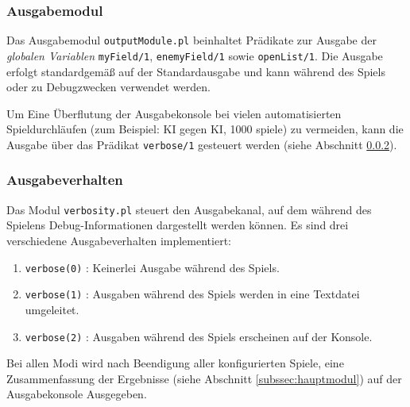 \subsubsection{Ausgabemodul}
		Das Ausgabemodul \texttt{outputModule.pl} beinhaltet Prädikate zur Ausgabe der \textit{globalen Variablen} \texttt{myField/1},
		\texttt{enemyField/1} sowie \texttt{openList/1}. Die Ausgabe erfolgt standardgemäß auf der Standardausgabe und kann während des Spiels oder zu
		Debugzwecken verwendet werden.

		Um Eine Überflutung der Ausgabekonsole bei vielen automatisierten Spieldurchläufen (zum Beispiel: KI gegen KI, 1000 spiele) zu vermeiden, kann 
		die Ausgabe über das Prädikat \texttt{verbose/1} gesteuert werden (siehe Abschnitt \ref{ssub:ausgabeverhalten}).
\subsubsection{Ausgabeverhalten} %
\label{ssub:ausgabeverhalten}
		Das Modul \texttt{verbosity.pl} steuert den Ausgabekanal, auf dem während des Spielens Debug-Informationen dargestellt werden können. 
		Es sind drei verschiedene Ausgabeverhalten implementiert:
			\begin{enumerate}
				\item \texttt{verbose(0)} : Keinerlei Ausgabe während des Spiels.
				\item \texttt{verbose(1)} : Ausgaben während des Spiels werden in eine Textdatei umgeleitet.
				\item \texttt{verbose(2)} : Ausgaben während des Spiels erscheinen auf der Konsole.
			\end{enumerate}
			Bei allen Modi wird nach Beendigung aller konfigurierten Spiele, eine Zusammenfassung der Ergebnisse (siehe Abschnitt \ref{subssec:hauptmodul}) 
			auf der Ausgabekonsole Ausgegeben.

